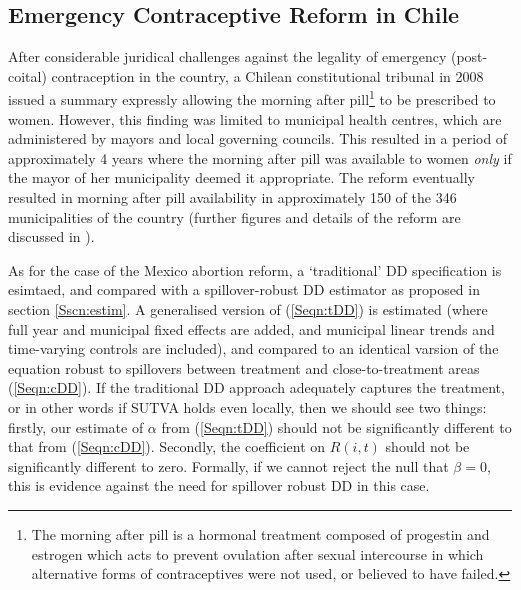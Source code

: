 \documentclass{article}
\begin{document}
\begin{spacing}{1.1}
\subsection{Emergency Contraceptive Reform in Chile}
After considerable juridical challenges against the legality of emergency 
(post-coital) contraception in the country, a Chilean constitutional tribunal in 
2008 issued a summary expressly allowing the morning after pill\footnote{The morning
  after pill is a hormonal treatment composed of progestin and estrogen which acts
to prevent ovulation after sexual intercourse in which alternative forms of 
contraceptives were not used, or believed to have failed.} to be prescribed
to women.  However, this finding was limited to municipal health centres, which
are administered by mayors and local governing councils.  This resulted in a 
period of approximately 4 years where the morning after pill was available to
women \emph{only} if the mayor of her municipality deemed it appropriate.  The
reform eventually resulted in morning after pill availability in approximately
150 of the 346 municipalities of the country (further figures and details of the
reform are discussed in \citet{Clarke2014}).

As for the case of the Mexico abortion reform, a `traditional' DD specification
is esimtaed, and compared with a spillover-robust DD estimator as proposed in
section \ref{Sscn:estim}.  A generalised version of (\ref{Seqn:tDD}) is estimated
(where full year and municipal fixed effects are added, and municipal linear 
trends and time-varying controls are included), and compared to an identical
varsion of the equation robust to spillovers between treatment and 
close-to-treatment areas (\ref{Seqn:cDD}).  If the traditional DD approach 
adequately captures the treatment, or in other words if SUTVA holds even locally,
then we should see two things: firstly, our estimate of $\alpha$ from 
(\ref{Seqn:tDD}) should not be significantly different to that from (\ref{Seqn:cDD}).
Secondly, the coefficient on $R(i,t)$ should not be significantly different to
zero.  Formally, if we cannot reject the null that $\beta=0$, this is evidence 
against the need for spillover robust DD in this case.  


\end{spacing}
\end{document}
